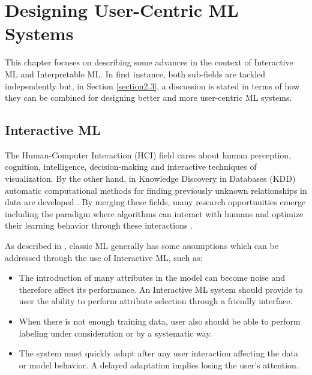 
\chapter{Designing User-Centric ML Systems}
\label{chapter2}

\graphicspath{{Chapter2/figs/}}

This chapter focuses on describing some advances in the context of Interactive ML and Interpretable ML. In first instance, both sub-fields are tackled independently but, in Section \ref{section2.3}, a discussion is stated in terms of how they can be combined for designing better and more user-centric ML systems.

\section{Interactive ML}
\label{section2.1}

The Human-Computer Interaction (HCI) field cares about human perception, cognition, intelligence, decision-making and interactive techniques of visualization. By the other hand, in Knowledge Discovery in Databases (KDD) automatic computational methods for finding previously unknown relationships in data are developed \cite{Holzinger2013}. By merging these fields, many research opportunities emerge including the paradigm where algorithms can interact with humans and optimize their learning behavior through these interactions \cite{Holzinger2016}. 

As described in \cite{Fails2003}, classic ML generally has some assumptions which can be addressed through the use of Interactive ML, such as:

\begin{itemize}
\item The introduction of many attributes in the model can become noise and therefore affect its performance. An Interactive ML system should provide to user the ability to perform attribute selection through a friendly interface.
\item When there is not enough training data, user also should be able to perform labeling under consideration or by a systematic way.
\item The system must quickly adapt after any user interaction affecting the data or model behavior. A delayed adaptation implies losing the user's attention.
\end{itemize}


